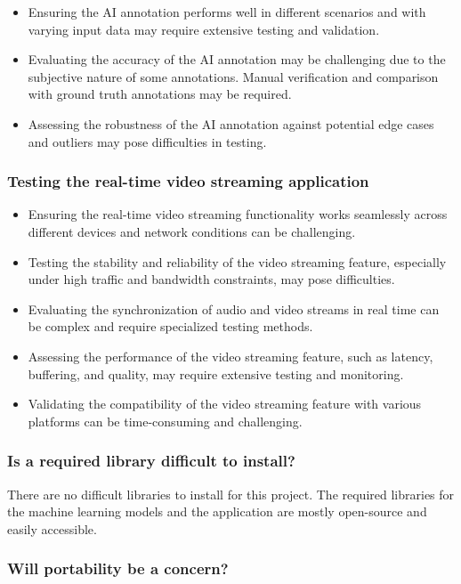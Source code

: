 \documentclass{article}
\begin{document}
\begin{itemize}
\item Ensuring the AI annotation performs well in different scenarios and with
  varying input data may require extensive testing and validation.
\item Evaluating the accuracy of the AI annotation may be challenging due to the
  subjective nature of some annotations. Manual verification and comparison with
  ground truth annotations may be required.
\item Assessing the robustness of the AI annotation against potential edge cases
  and outliers may pose difficulties in testing.
\end{itemize}

\subsubsection{Testing the real-time video streaming application}

\begin{itemize}
\item Ensuring the real-time video streaming functionality works seamlessly across
  different devices and network conditions can be challenging.
\item Testing the stability and reliability of the video streaming feature,
  especially under high traffic and bandwidth constraints, may pose
  difficulties.
\item Evaluating the synchronization of audio and video streams in real time can be
  complex and require specialized testing methods.
\item Assessing the performance of the video streaming feature, such as latency,
  buffering, and quality, may require extensive testing and monitoring.
\item Validating the compatibility of the video streaming feature with various
  platforms can be time-consuming and challenging.
\end{itemize}

\subsubsection{Is a required library difficult to install?}

There are no difficult libraries to install for this project. The required
libraries for the machine learning models and the application are mostly
open-source and easily accessible.

\subsubsection{Will portability be a concern?}
\end{document}
